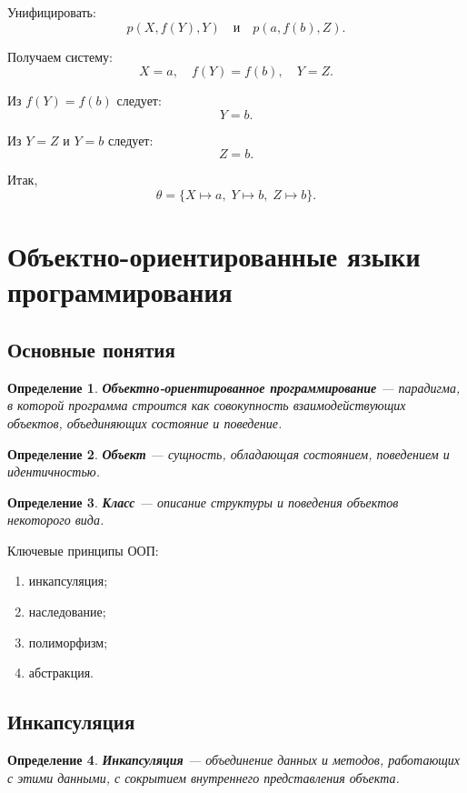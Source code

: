 \documentclass[12pt,a4paper]{article}
\newtheorem{definition}{Определение}
\begin{document}
Унифицировать:
$$
p(X,f(Y),Y)
\quad\text{и}\quad
p(a,f(b),Z).
$$

Получаем систему:
$$
X=a,\quad f(Y)=f(b),\quad Y=Z.
$$

Из $f(Y)=f(b)$ следует:
$$
Y=b.
$$

Из $Y=Z$ и $Y=b$ следует:
$$
Z=b.
$$

Итак,
$$
\theta = \{X \mapsto a,\; Y \mapsto b,\; Z \mapsto b\}.
$$

\section{Объектно-ориентированные языки программирования}

\subsection{Основные понятия}

\begin{definition}
\textbf{Объектно-ориентированное программирование} --- парадигма, в которой программа строится как совокупность взаимодействующих объектов, объединяющих состояние и поведение.
\end{definition}

\begin{definition}
\textbf{Объект} --- сущность, обладающая состоянием, поведением и идентичностью.
\end{definition}

\begin{definition}
\textbf{Класс} --- описание структуры и поведения объектов некоторого вида.
\end{definition}

Ключевые принципы ООП:
\begin{enumerate}
    \item инкапсуляция;
    \item наследование;
    \item полиморфизм;
    \item абстракция.
\end{enumerate}

\subsection{Инкапсуляция}

\begin{definition}
\textbf{Инкапсуляция} --- объединение данных и методов, работающих с этими данными, с сокрытием внутреннего представления объекта.
\end{definition}
\end{document}
